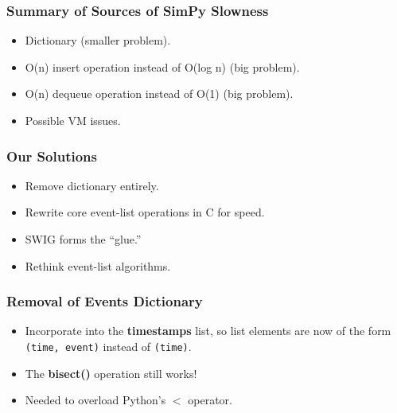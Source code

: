 \documentclass{beamer}
\begin{document}
\begin{frame}
\frametitle{Summary of Sources of SimPy Slowness}

\pause

\begin{itemize}

\item Dictionary (smaller problem).

\pause

\item O(n) insert operation instead of O(log n) (big problem).

\pause

\item O(n) dequeue operation instead of O(1) (big problem).

\pause

\item Possible VM issues.

\end{itemize}

\end{frame}

\begin{frame}
\frametitle{Our Solutions}

\begin{itemize}

\pause

\item Remove dictionary entirely.

\pause

\item Rewrite core event-list operations in C for speed.

\pause

\item SWIG forms the ``glue.''

\pause

\item Rethink event-list algorithms. 

\end{itemize}

\end{frame}

\begin{frame}
\frametitle{Removal of Events Dictionary}

\pause

\begin{itemize}

\item Incorporate into the {\bf timestamps} list, so list elements are
now of the form {\tt (time, event)} instead of {\tt (time)}.

\pause

\item The {\bf bisect()} operation still works!

\pause

\item Needed to overload Python's $<$ operator.

\end{itemize}

\end{frame}
\end{document}
